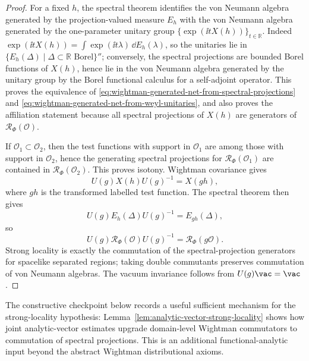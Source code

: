 \begin{proof}
For a fixed \(h\), the spectral theorem identifies the von Neumann algebra
generated by the projection-valued measure \(E_h\) with the von Neumann
algebra generated by the one-parameter unitary group
\(\{\exp(\ii tX(h))\}_{t\in\mathbb R}\).  Indeed
\(\exp(\ii tX(h))=\int \exp(\ii t\lambda)\,\dd E_h(\lambda)\), so the
unitaries lie in
\(\{E_h(\Delta)\mid\Delta\subset\mathbb R\text{ Borel}\}''\); conversely, the
spectral projections are bounded Borel functions of \(X(h)\), hence lie in
the von Neumann algebra generated by the unitary group by the Borel functional
calculus for a self-adjoint operator.  This proves the equivalence of
\eqref{eq:wightman-generated-net-from-spectral-projections} and
\eqref{eq:wightman-generated-net-from-weyl-unitaries}, and also proves the
affiliation statement because all spectral projections of \(X(h)\) are
generators of \(\mathcal R_\Phi(\mathcal O)\).

If \(\mathcal O_1\subset\mathcal O_2\), then the test functions with support in
\(\mathcal O_1\) are among those with support in \(\mathcal O_2\), hence the
generating spectral projections for
\(\mathcal R_\Phi(\mathcal O_1)\) are contained in
\(\mathcal R_\Phi(\mathcal O_2)\).  This proves isotony.  Wightman covariance
gives
\[
  U(g)X(h)U(g)^{-1}=X(g h),
\]
where \(g h\) is the transformed labelled test function.  The spectral theorem
then gives
\[
  U(g)E_h(\Delta)U(g)^{-1}=E_{g h}(\Delta),
\]
so
\[
  U(g)\mathcal R_\Phi(\mathcal O)U(g)^{-1}
  =
  \mathcal R_\Phi(g\mathcal O).
\]
Strong locality is exactly the commutation of the spectral-projection
generators for spacelike separated regions; taking double commutants preserves
commutation of von Neumann algebras.  The vacuum invariance follows from
\(U(g)\vac=\vac\).
\end{proof}

The constructive checkpoint below records a useful sufficient mechanism for
the strong-locality hypothesis: Lemma~\ref{lem:analytic-vector-strong-locality}
shows how joint analytic-vector estimates upgrade domain-level Wightman
commutators to commutation of spectral projections.  This is an additional
functional-analytic input beyond the abstract Wightman distributional axioms.

